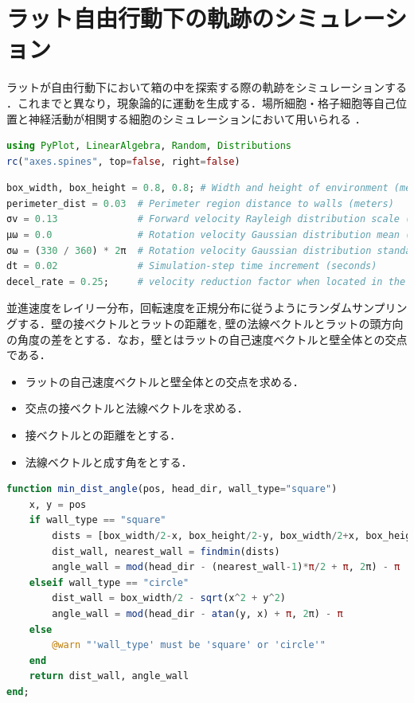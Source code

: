 \section{ラット自由行動下の軌跡のシミュレーション}
ラットが自由行動下において箱の中を探索する際の軌跡をシミュレーションする \citep{Raudies2012-gp}．これまでと異なり，現象論的に運動を生成する．場所細胞・格子細胞等自己位置と神経活動が相関する細胞のシミュレーションにおいて用いられる \citep{George2024-rv}．
\begin{lstlisting}[language=julia]
using PyPlot, LinearAlgebra, Random, Distributions
rc("axes.spines", top=false, right=false)
\end{lstlisting}
\begin{lstlisting}[language=julia]
box_width, box_height = 0.8, 0.8; # Width and height of environment (meters)
perimeter_dist = 0.03  # Perimeter region distance to walls (meters)
σv = 0.13              # Forward velocity Rayleigh distribution scale (m/sec)
μω = 0.0               # Rotation velocity Gaussian distribution mean (rad/sec)
σω = (330 / 360) * 2π  # Rotation velocity Gaussian distribution standard deviation (rad/sec)
dt = 0.02              # Simulation-step time increment (seconds)
decel_rate = 0.25;     # velocity reduction factor when located in the perimeter
\end{lstlisting}
並進速度をレイリー分布，回転速度を正規分布に従うようにランダムサンプリングする．壁の接ベクトルとラットの距離を, 壁の法線ベクトルとラットの頭方向の角度の差をとする．なお，壁とはラットの自己速度ベクトルと壁全体との交点である．
\begin{itemize}
\item ラットの自己速度ベクトルと壁全体との交点を求める．
\item 交点の接ベクトルと法線ベクトルを求める．
\item 接ベクトルとの距離をとする．
\item 法線ベクトルと成す角をとする．
\end{itemize}
\begin{lstlisting}[language=julia]
function min_dist_angle(pos, head_dir, wall_type="square")
    x, y = pos
    if wall_type == "square"
        dists = [box_width/2-x, box_height/2-y, box_width/2+x, box_height/2+y]
        dist_wall, nearest_wall = findmin(dists)
        angle_wall = mod(head_dir - (nearest_wall-1)*π/2 + π, 2π) - π
    elseif wall_type == "circle"
        dist_wall = box_width/2 - sqrt(x^2 + y^2)
        angle_wall = mod(head_dir - atan(y, x) + π, 2π) - π
    else
        @warn "'wall_type' must be 'square' or 'circle'"
    end 
    return dist_wall, angle_wall
end;
\end{lstlisting}
